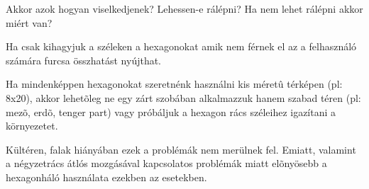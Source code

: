 Akkor azok hogyan viselkedjenek? 
Lehessen-e rálépni?
Ha nem lehet rálépni akkor miért van?

Ha csak kihagyjuk a széleken a hexagonokat amik nem férnek el az a felhasználó számára furcsa összhatást nyújthat.

Ha mindenképpen hexagonokat  szeretnénk használni kis méretû térképen (pl: 8x20), akkor lehetõleg ne egy zárt szobában alkalmazzuk hanem szabad téren (pl: mezõ, erdõ, tenger part) vagy próbáljuk a hexagon rács széleihez igazítani a környezetet.

Kültéren, falak hiányában ezek a problémák nem merülnek fel. Emiatt, valamint a négyzetrács átlós mozgásával kapcsolatos problémák miatt elõnyösebb a hexagonháló használata ezekben az esetekben.

